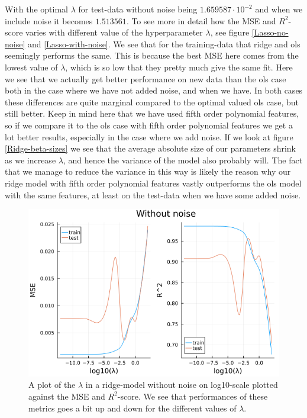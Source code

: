 \documentclass{article}
\begin{document}
With the optimal $\lambda$ for test-data without noise being $1.659587\cdot
    10^{-2}$ and when we include noise it becomes $1.513561$.
To see more in detail how the MSE and $R^2$-score varies with different value of
the hyperparameter $\lambda$, see figure \ref{Lasso-no-noise} and
\ref{Lasso-with-noise}. We see that for the training-data that ridge and ols
seemingly performs the same.  This is because the best MSE here comes from the
lowest value of $\lambda$, which is so low that they pretty much give the same
fit. Here we see that we actually get better performance on new data than the
ols case both in the case where we have not added noise, and when we have. In
both cases these differences are quite marginal compared to the optimal valued
ols case, but still better. Keep in mind here that we have used fifth order
polynomial features, so if we compare it to the ols case with fifth order
polynomial features we get a lot better results, especially in the case where we
add noise. If we look at figure \ref{Ridge-beta-sizes} we see that the average
absolute size of our parameters shrink as we increase $\lambda$, and hence the
variance of the model also probably will.  The fact that we manage to reduce the
variance in this way is likely the reason why our ridge model with fifth order
polynomial features vastly outperforms the ols model with the same features, at
least on the test-data when we have some added noise.
\begin{figure}
    \centerline{\includegraphics[scale=0.5]{ridge_without_noise}}
    \caption{A plot of the $\lambda$ in a ridge-model without noise on log10-scale plotted against the MSE and $R^2$-score. We see that performances of these metrics goes a bit up and down for the different values of $\lambda$.}
    \label{Ridge-with-noise}
\end{figure}
\end{document}
